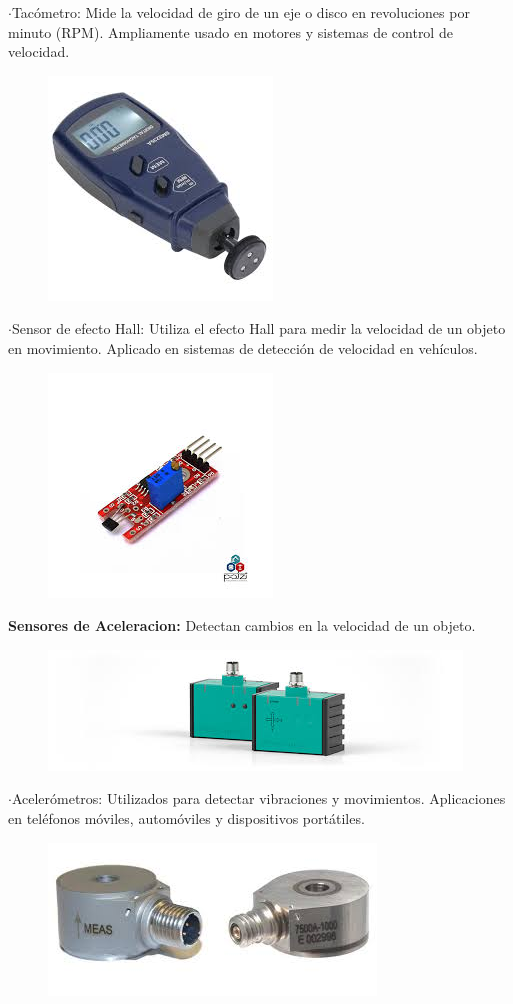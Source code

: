 	$\cdot$Tacómetro: Mide la velocidad de giro de un eje o disco en revoluciones por minuto (RPM). Ampliamente usado en motores y sistemas de control de velocidad.


\begin{figure} [h]
	\centering
	\includegraphics[width=0.3\linewidth]{img/tacometro}
	\caption{}
	\label{fig:tacometro}
\end{figure}

\newpage
	$\cdot$Sensor de efecto Hall: Utiliza el efecto Hall para medir la velocidad de un objeto en movimiento. Aplicado en sistemas de detección de velocidad en vehículos.


\begin{figure} [h]
	\centering
	\includegraphics[width=0.3\linewidth]{img/sensorhall}
	\caption{}
	\label{fig:sensorhall}
\end{figure}


\textbf{Sensores de Aceleracion:}
	Detectan cambios en la velocidad de un objeto.

\begin{figure} [h]
	\centering
	\includegraphics[width=0.3\linewidth]{img/sensoraceleracion}
	\caption{}
	\label{fig:sensoraceleracion}
\end{figure}


	$\cdot$Acelerómetros: Utilizados para detectar vibraciones y movimientos. Aplicaciones en teléfonos móviles, automóviles y dispositivos portátiles.


\begin{figure} [h]
	\centering
	\includegraphics[width=0.3\linewidth]{img/acelerometrosensor}
	\caption{}
	\label{fig:acelerometrosensor}
\end{figure}


